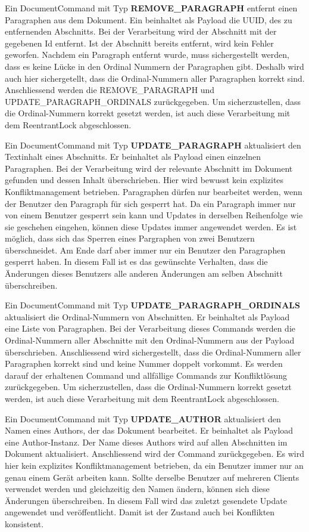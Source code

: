 Ein DocumentCommand mit Typ \textbf{REMOVE\_PARAGRAPH} entfernt einen Paragraphen aus dem Dokument.
Ein beinhaltet als Payload die UUID, des zu entfernenden Abschnitts.
Bei der Verarbeitung wird der Abschnitt mit der gegebenen Id entfernt.
Ist der Abschnitt bereits entfernt, wird kein Fehler geworfen.
Nachdem ein Paragraph entfernt wurde, muss sichergestellt werden, dass es keine Lücke in den Ordinal Nummern der Paragraphen gibt.
Deshalb wird auch hier sichergetellt, dass die Ordinal-Nummern aller Paragraphen korrekt sind.
Anschliessend werden die REMOVE\_PARAGRAPH und UPDATE\_PARAGRAPH\_ORDINALS zurückgegeben.
Um sicherzustellen, dass die Ordinal-Nummern korrekt gesetzt werden, ist auch diese Verarbeitung mit dem ReentrantLock abgeschlossen.

Ein DocumentCommand mit Typ \textbf{UPDATE\_PARAGRAPH} aktualisiert den Textinhalt eines Abschnitts.
Er beinhaltet als Payload einen einzelnen Paragraphen.
Bei der Verarbeitung wird der relevante Abschnitt im Dokument gefunden und dessen Inhalt überschrieben.
Hier wird bewusst kein explizites Konfliktmanagement betrieben.
Paragraphen dürfen nur bearbeitet werden, wenn der Benutzer den Paragraph für sich gesperrt hat.
Da ein Paragraph immer nur von einem Benutzer gesperrt sein kann und Updates in derselben Reihenfolge wie sie geschehen eingehen, können diese Updates immer angewendet werden.
Es ist möglich, dass sich das Sperren eines Pargraphen von zwei Benutzern überschneidet.
Am Ende darf aber immer nur ein Benutzer den Paragraphen gesperrt haben.
In diesem Fall ist es das gewünschte Verhalten, dass die Änderungen dieses Benutzers alle anderen Änderungen am selben Abschnitt überschreiben. 

Ein DocumentCommand mit Typ \textbf{UPDATE\_PARAGRAPH\_ORDINALS} aktualisiert die Ordinal-Nummern von Abschnitten.
Er beinhaltet als Payload eine Liste von Paragraphen.
Bei der Verarbeitung dieses Commands werden die Ordinal-Nummern aller Abschnitte mit den Ordinal-Nummern aus der Payload überschrieben.
Anschliessend wird sichergestellt, dass die Ordinal-Nummern aller Paragraphen korrekt sind und keine Nummer doppelt vorkommt.
Es werden darauf der erhaltenen Command und allfällige Commands zur Konfliktlösung zurückgegeben.
Um sicherzustellen, dass die Ordinal-Nummern korrekt gesetzt werden, ist auch diese Verarbeitung mit dem ReentrantLock abgeschlossen.

Ein DocumentCommand mit Typ \textbf{UPDATE\_AUTHOR} aktualisiert den Namen eines Authors, der das Dokument bearbeitet.
Er beinhaltet als Payload eine Author-Instanz.
Der Name dieses Authors wird auf allen Abschnitten im Dokument aktualisiert.
Anschliessend wird der Command zurückgegeben.
Es wird hier kein explizites Konfliktmanagement betrieben, da ein Benutzer immer nur an genau einem Gerät arbeiten kann.
Sollte derselbe Benutzer auf mehreren Clients verwendet werden und gleichzeitig den Namen ändern, können sich diese Änderungen überschreiben.
In diesem Fall wird das zuletzt gesendete Update angewendet und veröffentlicht.
Damit ist der Zustand auch bei Konflikten konsistent.

